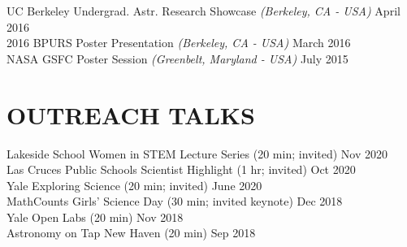 \documentclass[margin]{res}
\begin{document}
\begin{resume}
UC Berkeley Undergrad. Astr. Research Showcase \textit{(Berkeley, CA - USA)} \hfill April 2016 \\
2016 BPURS Poster Presentation \textit{(Berkeley, CA - USA)} \hfill March 2016 \\
NASA GSFC Poster Session \textit{(Greenbelt, Maryland - USA)} \hfill July 2015


\section{\normalfont OUTREACH TALKS}
Lakeside School Women in STEM Lecture Series (20 min; invited) \hfill Nov 2020 \\
Las Cruces Public Schools Scientist Highlight (1 hr; invited) \hfill Oct 2020 \\
Yale Exploring Science (20 min; invited) \hfill June 2020 \\
MathCounts Girls' Science Day (30 min; invited keynote) \hfill Dec 2018 \\
Yale Open Labs (20 min) \hfill Nov 2018 \\
Astronomy on Tap New Haven (20 min) \hfill Sep 2018


\end{resume}
\end{document}
